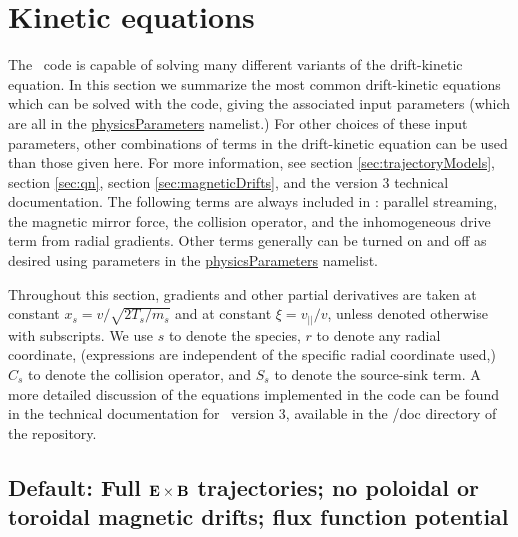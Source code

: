 \chapter{Kinetic equations}

The \sfincs~code is capable of solving many different variants of the drift-kinetic equation.
In this section we summarize the most common drift-kinetic equations
which can be solved with the code, giving the associated input parameters
(which are all in the  {\ttfamily \hyperref[sec:physicsParameters]{physicsParameters}} namelist.)
For other choices of these input parameters, 
other combinations of terms in the drift-kinetic equation can be used than those
given here.
For more information, see section \ref{sec:trajectoryModels}, section \ref{sec:qn}, section \ref{sec:magneticDrifts},
and the version 3 technical documentation.
The following terms are always included in \sfincs:
parallel streaming, the magnetic mirror force, the collision operator,
and the inhomogeneous drive term from radial gradients.
Other terms generally can be turned on and off as desired using parameters in the
{\ttfamily \hyperref[sec:physicsParameters]{physicsParameters}} namelist.

Throughout this section, gradients and other partial derivatives are taken
at constant $x_s = v/\sqrt{2T_s/m_s}$ and at constant $\xi = v_{||} / v$, unless denoted otherwise with subscripts.
We use $s$ to denote the species, $r$ to denote any radial coordinate, (expressions are independent
of the specific radial coordinate used,)
$C_s$ to denote the collision operator, and $S_s$ to denote the source-sink term.
A more detailed discussion of the equations implemented in the code can be found
in the technical documentation for \sfincs~version 3, available in the {\ttfamily /doc} directory
of the repository.

\section{Default: Full ${\mathbf E}\times{\mathbf B}$ trajectories; no poloidal or toroidal magnetic drifts; flux function potential}

